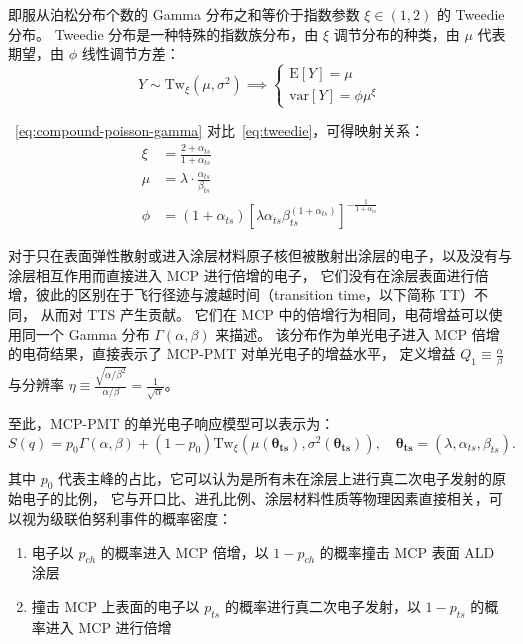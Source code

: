 即服从泊松分布个数的 Gamma 分布之和等价于指数参数 $\xi\in(1, 2)$ 的 Tweedie 分布。
Tweedie 分布是一种特殊的指数族分布，由 $\xi$ 调节分布的种类，由 $\mu$ 代表期望，由 $\phi$ 线性调节方差：
\begin{equation}
    Y\sim\mathrm{Tw}_{\xi}(\mu, \sigma^2)\implies 
    \left\{
        \begin{array}{c}
        \mathrm{E}[Y]=\mu \\
        \mathrm{var}[Y]=\phi\mu^{\xi}
        \end{array}
    \right.
    \label{eq:tweedie}
\end{equation}

~\eqref{eq:compound-poisson-gamma} 对比~\eqref{eq:tweedie}，可得映射关系：
\begin{align}
    \xi & = \frac{2+\alpha_{ts}}{1+\alpha_{ts}}\\
    \mu & = \lambda\cdot\frac{\alpha_{ts}}{\beta_{ts}}\\
    \phi & = (1+\alpha_{ts})\left[\lambda\alpha_{ts}\beta_{ts}^{(1+\alpha_{ts})}\right]^{-\frac{1}{1+\alpha_{ts}}}
\end{align}

对于只在表面弹性散射或进入涂层材料原子核但被散射出涂层的电子，以及没有与涂层相互作用而直接进入 MCP 进行倍增的电子，
它们没有在涂层表面进行倍增，彼此的区别在于飞行径迹与渡越时间（transition time，以下简称 TT）不同，
从而对 TTS 产生贡献。
它们在 MCP 中的倍增行为相同，电荷增益可以使用同一个 Gamma 分布 $\Gamma(\alpha, \beta)$ 来描述。
该分布作为单光电子进入 MCP 倍增的电荷结果，直接表示了 MCP-PMT 对单光电子的增益水平，
定义增益 $Q_1\equiv\frac{\alpha}{\beta}$ 与分辨率 $\eta\equiv\frac{\sqrt{\alpha/\beta^2}}{\alpha/\beta}=\frac{1}{\sqrt{\alpha}}$。

至此，MCP-PMT 的单光电子响应模型可以表示为：
\begin{equation}
    S(q)=p_0\Gamma(\alpha, \beta)+(1-p_0)\mathrm{Tw}_{\xi}
    \left(\mu(\boldsymbol{\theta_{ts}}),\sigma^2(\boldsymbol{\theta_{ts}})\right),\quad
    \boldsymbol{\theta_{ts}}=(\lambda, \alpha_{ts},\beta_{ts}).
\end{equation}

其中 $p_0$ 代表主峰的占比，它可以认为是所有未在涂层上进行真二次电子发射的原始电子的比例，
它与开口比、进孔比例、涂层材料性质等物理因素直接相关，可以视为级联伯努利事件的概率密度：
\begin{enumerate}
    \item 电子以 $p_{ch}$ 的概率进入 MCP 倍增，以 $1-p_{ch}$ 的概率撞击 MCP 表面 ALD 涂层
    \item 撞击 MCP 上表面的电子以 $p_{ts}$ 的概率进行真二次电子发射，以 $1-p_{ts}$ 的概率进入 MCP 进行倍增
\end{enumerate}


